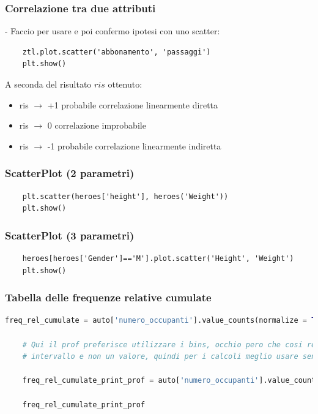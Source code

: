 \documentclass{article}
\begin{document}
\subsubsection*{Correlazione tra due attributi}

- Faccio  per usare  e poi confermo ipotesi con uno scatter:

\begin{lstlisting}
    ztl.plot.scatter('abbonamento', 'passaggi')
    plt.show()
\end{lstlisting}

A seconda del risultato $ris$ ottenuto:

\begin{itemize}
    \item ris $\to$ +1 probabile correlazione linearmente diretta
    \item ris $\to$ 0 correlazione improbabile
    \item ris $\to$ -1 probabile correlazione linearmente indiretta
\end{itemize}

\subsubsection*{ScatterPlot (2 parametri)}

\begin{lstlisting}
    plt.scatter(heroes['height'], heroes('Weight'))
    plt.show()
\end{lstlisting}

\subsubsection*{ScatterPlot (3 parametri)}

\begin{lstlisting}
    heroes[heroes['Gender']=='M'].plot.scatter('Height', 'Weight')
    plt.show()
\end{lstlisting}

\subsubsection*{Tabella delle frequenze relative cumulate}

\begin{lstlisting}[language=Python]
    freq_rel_cumulate = auto['numero_occupanti'].value_counts(normalize = True).sort_index().cumsum()

    # Qui il prof preferisce utilizzare i bins, occhio pero che cosi restituisce un 
    # intervallo e non un valore, quindi per i calcoli meglio usare senza bins

    freq_rel_cumulate_print_prof = auto['numero_occupanti'].value_counts(normalize = True, bins = 10).sort_index().cumsum()

    freq_rel_cumulate_print_prof
\end{lstlisting}
\end{document}
